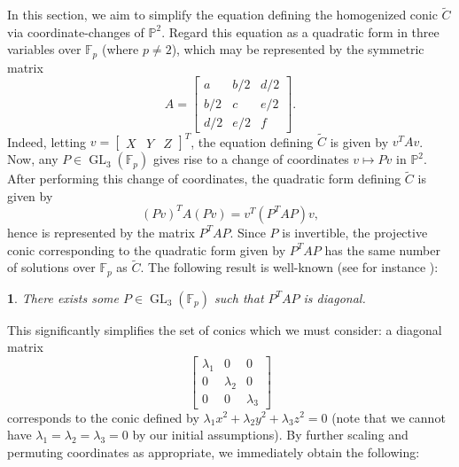 \documentclass[10pt,a4paper]{amsart}
\numberwithin{equation}{section}
\numberwithin{figure}{section}
\theoremstyle{definition}
\theoremstyle{remark}
\theoremstyle{plain}
\newtheorem{thm}{\protect\theoremname}[section]
\theoremstyle{plain}
\theoremstyle{definition}
\theoremstyle{plain}
\theoremstyle{plain}
\providecommand{\theoremname}{Theorem}
\renewcommand{\P}{\mathbb{P}}
\newcommand{\F}{\mathbb{F}}
\newcommand{\GL}{\operatorname{GL}}
\begin{document}
    In this section, we aim to simplify the equation defining the homogenized conic $\widetilde{C}$ via coordinate-changes of $\P^2$. Regard this equation as a quadratic form in three variables over $\F_p$ (where $p\ne 2$), which may be represented by the symmetric matrix
	\begin{equation*}
	A=\begin{bmatrix}
	a&b/2&d/2\\
	b/2&c&e/2\\
	d/2&e/2&f
	\end{bmatrix}.
	\end{equation*}
	Indeed, letting $v=[\begin{matrix}X&Y&Z\end{matrix}]^T$, the equation defining $\widetilde{C}$ is given by $v^TAv$. Now, any $P\in\GL_3(\F_p)$ gives rise to a change of coordinates $v\mapsto Pv$ in $\P^2$. After performing this change of coordinates, the quadratic form defining $\widetilde{C}$ is given by
	\begin{equation*}
	(Pv)^TA(Pv)=v^T(P^TAP)v,
	\end{equation*}
	hence is represented by the matrix $P^TAP$. Since $P$ is invertible, the projective conic corresponding to the quadratic form given by $P^TAP$ has the same number of solutions over $\F_p$ as $\widetilde{C}$. The following result is well-known (see for instance \cite[Prop.~42:1]{omeara}):
	\begin{thm}
	\label{thm:diag}
	There exists some $P\in\GL_3(\F_p)$ such that $P^TAP$ is diagonal.
	\end{thm}
	This significantly simplifies the set of conics which we must consider: a diagonal matrix
	\begin{equation*}
	\begin{bmatrix}
	\lambda_1&0&0\\
	0&\lambda_2&0\\
	0&0&\lambda_3
	\end{bmatrix}
	\end{equation*}
	corresponds to the conic defined by $\lambda_1x^2+\lambda_2y^2+\lambda_3z^2=0$ (note that we cannot have $\lambda_1=\lambda_2=\lambda_3=0$ by our initial assumptions). By further scaling and permuting coordinates as appropriate, we immediately obtain the following:
\end{document}
